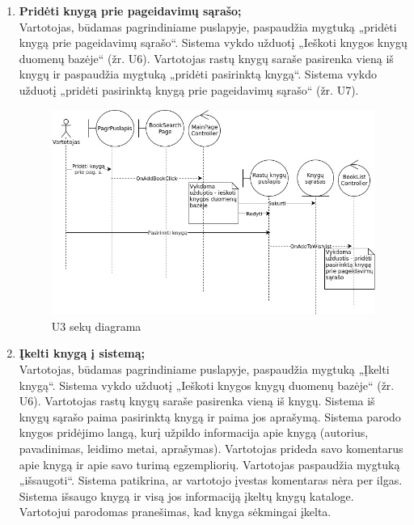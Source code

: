 \documentclass{VUMIFPSkursinis}
\begin{document}
\begin{enumerate}[label=\textbf{U\arabic*.}]
			\item \textbf{Pridėti knygą prie pageidavimų sąrašo;} \\
				Vartotojas, būdamas pagrindiniame puslapyje, paspaudžia mygtuką „pridėti knygą prie pageidavimų sąrašo“. 
				Sistema vykdo užduotį „Ieškoti knygos knygų duomenų bazėje“ (žr. U6).
				Vartotojas rastų knygų saraše pasirenka vieną iš knygų ir paspaudžia mygtuką „pridėti pasirinktą knygą“.
				Sistema vykdo užduotį „pridėti pasirinktą knygą prie pageidavimų sąrašo“ (žr. U7).
				\begin{figure}[H]
					\centering
					\includegraphics[scale=0.7]{img/U3-sequence.png}
					\caption{U3 sekų diagrama}
					\label{img:psi2-u3-sequence}
				\end{figure}
			\item \textbf{Įkelti knygą į sistemą;}\\
				Vartotojas, būdamas pagrindiniame puslapyje, paspaudžia mygtuką „Įkelti knygą“. Sistema vykdo užduotį „Ieškoti knygos knygų duomenų bazėje“ (žr. U6).
				Vartotojas rastų knygų saraše pasirenka vieną iš knygų. Sistema iš knygų sąrašo paima pasirinktą knygą ir paima jos aprašymą.
				Sistema parodo knygos pridėjimo langą, kurį užpildo informacija apie knygą (autorius, pavadinimas, leidimo metai, aprašymas). Vartotojas prideda savo komentarus apie knygą ir apie
				savo turimą egzempliorių. Vartotojas paspaudžia mygtuką „išsaugoti“. Sistema patikrina, ar vartotojo įvestas komentaras nėra per ilgas.
				Sistema išsaugo knygą ir visą jos informaciją įkeltų knygų kataloge. Vartotojui parodomas pranešimas, kad knyga sėkmingai įkelta.\\
				\begin{figure}[H]
					\centering

\end{figure}
\end{enumerate}
\end{document}
